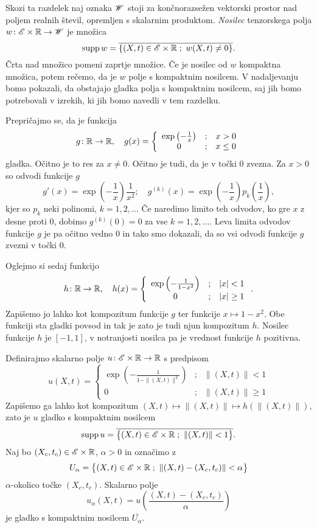 Skozi ta razdelek naj oznaka $\mathscr W$ stoji za
končnorazsežen vektorski prostor nad poljem realnih števil, opremljen s skalarnim produktom.
\emph{Nosilec} tenzorskega polja $w\colon\mathscr E\times\mathbb R\to\mathscr W$ je množica
\[ \mathrm{supp}\,w=\overline{\{ (X,t)\in\mathscr E\times\mathbb R\; ;\ w(X,t)\neq 0 \}}. \]
Črta nad množico pomeni zaprtje množice. Če je nosilec od $w$ kompaktna množica, potem rečemo,
da je $w$ polje s kompaktnim nosilcem. V nadaljevanju bomo pokazali, da obstajajo gladka polja
s kompaktnim nosilcem, saj jih bomo potrebovali v izrekih, ki jih bomo navedli v tem razdelku.

Prepričajmo se, da je funkcija
\[
	g\colon\mathbb R\to\mathbb R,\quad g(x)=\left\{\begin{array}{ccl}
	\exp\left(-\frac{1}{x}\right)&;&x>0 \\ 0&;&x\leq 0 \end{array}\right.
\]
gladka. Očitno je to res za $x\neq 0$. Očitno je tudi, da je v točki $0$ zvezna. Za $x>0$
so odvodi funkcije $g$
\[
	g'(x)=\exp\left(-\frac{1}{x}\right)\frac{1}{x^2};\quad
	g^{(k)}(x)=\exp\left(-\frac{1}{x}\right)p_k\left(\frac{1}{x}\right),
\]
kjer so $p_k$ neki polinomi, $k=1,2,\dots$ Če naredimo limito teh odvodov, ko
gre $x$ z desne proti 0, dobimo $g^{(k)}(0)=0$ za vse $k=1,2,\dots$. Leva limita
odvodov funkcije $g$ je pa očitno vedno 0 in tako smo dokazali, da so vsi odvodi funkcije $g$ zvezni
v točki 0.

Oglejmo si sedaj funkcijo
\[
	h\colon\mathbb R\to\mathbb R,\quad h(x)=\left\{\begin{array}{ccl}
	\exp\left(-\frac{1}{1-x^2}\right)&;&|x|<1 \\ 0&;&|x|\geq 1 \end{array}\right. .
\]
Zapišemo jo lahko kot kompozitum funkcije $g$ ter funkcije $x\mapsto 1-x^2$. Obe funkciji sta
gladki povsod in tak je zato je tudi njun kompozitum $h$. Nosilec funkcije $h$ je
$[-1,1]$, v notranjosti nosilca pa je vrednost funkcije $h$ pozitivna.

Definirajmo skalarno polje $u\colon\mathscr E\times\mathbb R\to\mathbb R$ s predpisom
\[
	u(X,t)=\left\{\begin{array}{ccl}
	\exp\left(-\frac{1}{1-\|(X,t)\|^2}\right)&;&\|(X,t)\|<1 \\ 0&;&\|(X,t)\|\geq 1 \end{array}\right.
\]
Zapišemo ga lahko kot kompozitum $(X,t)\mapsto\|(X,t)\|\mapsto h(\|(X,t)\|)$, zato je
$u$ gladko s kompaktnim nosilcem
\[ \textrm{supp}\, u=\overline{\big\{(X,t)\in\mathscr E\times\mathbb R\; ;\ \|(X,t)\|<1 \big\}}. \]
Naj bo $(X_c,t_c)\in\mathscr E\times\mathbb R$, $\alpha > 0$ in označimo z
\begin{equation}\label{e:mnU}
	U_{\alpha}=\big\{(X,t)\in\E\times\R\; ;\ \|(X,t)-(X_c,t_c)\|<\alpha \big\}
\end{equation}
$\alpha$-okolico točke $(X_c,t_c)$. Skalarno polje
\begin{equation}\label{e:funu}
	u_{\alpha}(X,t)=u\left(\frac{(X,t)-(X_c,t_c)}{\alpha}\right)
\end{equation}
je gladko s kompaktnim nosilcem $\overline{U_{\alpha}}$.

